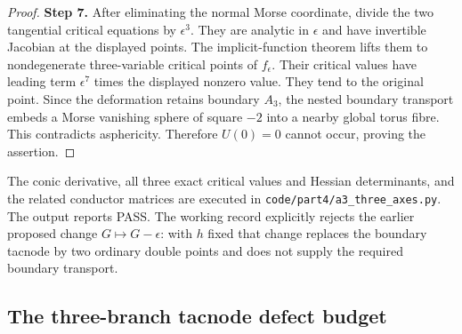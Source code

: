 \begin{proof}
\noindent\textbf{Step 7.} After eliminating the normal Morse coordinate, divide
the two tangential critical equations by $\epsilon^3$.
They are analytic in $\epsilon$ and have invertible
Jacobian at the displayed points. The implicit-function
theorem lifts them to nondegenerate three-variable
critical points of $f_\epsilon$. Their critical values
have leading term $\epsilon^7$ times the displayed
nonzero value. They tend to the original point.
Since the deformation retains boundary $A_3$, the
nested boundary transport embeds a Morse vanishing
sphere of square $-2$ into a nearby global torus fibre.
This contradicts asphericity. Therefore $U(0)=0$
cannot occur, proving the assertion.
\end{proof}

The conic derivative, all three exact critical values
and Hessian determinants, and the related conductor
matrices are executed in
\texttt{code/part4/a3\_three\_axes.py}.
The output reports PASS. The working record explicitly
rejects the earlier proposed change $G\mapsto G-\epsilon$:
with $h$ fixed that change replaces the boundary tacnode
by two ordinary double points and does not supply the
required boundary transport.


\subsection{The three-branch tacnode defect budget}


